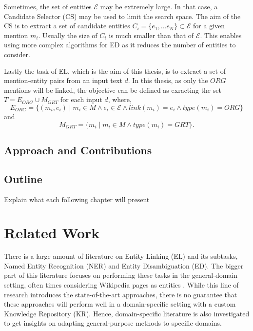 \documentclass{report}
\theoremstyle{definition}
\theoremstyle{remark}
\begin{document}
Sometimes, the set of entities $\mathcal{E}$ may be extremely large. In that case, a Candidate Selector (CS) may be used to limit the search space. The aim of the CS is to extract a set of candidate entities $C_i = \{e_1,...e_K\} \subset \mathcal{E} $ for a given mention $m_i$. Usually the size of $C_i$ is much smaller than that of $\mathcal{E}$. This enables using more complex algorithms for ED as it reduces the number of entities to consider.

Lastly the task of EL, which is the aim of this thesis, is to extract a set of mention-entity pairs from an input text $d$. In this thesis, as only the $ORG$ mentions will be linked, the objective can be defined as exracting the set $T = E_{ORG} \cup M_{GRT}$ for each input $d$, where,
\begin{equation}
E_{ORG}=\{(m_i,e_i) \mid m_i \in M \land e_i \in \mathcal{E} \land link(m_i)=e_i \land type(m_i) = ORG\}
\end{equation}
and 
\begin{equation}
M_{GRT} = \{m_i \mid m_i \in M \land type(m_i) = GRT\}.
\end{equation}

\newpage
\section{Approach and Contributions}

\newpage
\section{Outline}
Explain what each following chapter will present

\newpage
\chapter{Related Work}

There is a large amount of literature on Entity Linking (EL) and its subtasks, Named Entity Recognition (NER) and Entity Disambiguation (ED). The bigger part of this literature focuses on performing these tasks in the general-domain setting, often times considering Wikipedia pages as entities \cite{nlpnotes}. While this line of research introduces the state-of-the-art approaches, there is no guarantee that these approaches will perform well in a domain-specific setting with a custom Knowledge Repository (KR). Hence, domain-specific literature is also investigated to get insights on adapting general-purpose methods to specific domains.
\end{document}
